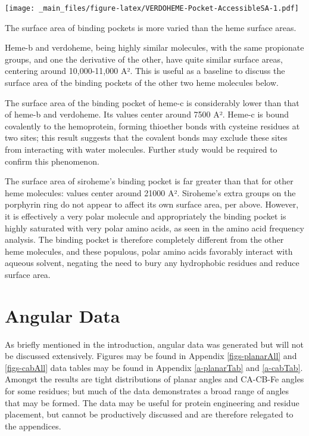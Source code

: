 \documentclass[a4paper, nobind]{templates/ociamthesis}
\let\origfigure\figure
\let\endorigfigure\endfigure
\renewenvironment{figure}[1][2] {
    \expandafter\origfigure\expandafter[H]
} {
    \endorigfigure
}
\begin{document}
\begin{figure}
\centering
\texttt{[image: \_main\_files/figure-latex/VERDOHEME-Pocket-AccessibleSA-1.pdf]}
\caption{\label{fig:VERDOHEME-Pocket-AccessibleSA}VERDOHEME: Pocket Accessible Surface Area}
\end{figure}

The surface area of binding pockets is more varied than the heme surface areas.

Heme-b and verdoheme, being highly similar molecules, with the same propionate groups, and one the derivative of the other, have quite similar surface areas, centering around 10,000-11,000 A². This is useful as a baseline to discuss the surface area of the binding pockets of the other two heme molecules below.

The surface area of the binding pocket of heme-c is considerably lower than that of heme-b and verdoheme. Its values center around 7500 A². Heme-c is bound covalently to the hemoprotein, forming thioether bonds with cysteine residues at two sites; this result suggests that the covalent bonds may exclude these sites from interacting with water molecules. Further study would be required to confirm this phenomenon.

The surface area of siroheme's binding pocket is far greater than that for other heme molecules: values center around 21000 A². Siroheme's extra groups on the porphyrin ring do not appear to affect its own surface area, per above. However, it is effectively a very polar molecule and appropriately the binding pocket is highly saturated with very polar amino acids, as seen in the amino acid frequency analysis. The binding pocket is therefore completely different from the other heme molecules, and these populous, polar amino acids favorably interact with aqueous solvent, negating the need to bury any hydrophobic residues and reduce surface area.

\hypertarget{angular-data}{%
\section{Angular Data}\label{angular-data}}

As briefly mentioned in the introduction, angular data was generated but will not be discussed extensively. Figures may be found in Appendix \ref{figs-planarAll} and \ref{figs-cabAll} data tables may be found in Appendix \ref{a-planarTab} and \ref{a-cabTab}. Amongst the results are tight distributions of planar angles and CA-CB-Fe angles for some residues; but much of the data demonstrates a broad range of angles that may be formed. The data may be useful for protein engineering and residue placement, but cannot be productively discussed and are therefore relegated to the appendices.
\end{document}
